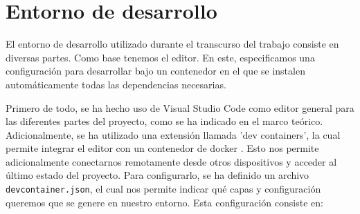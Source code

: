 \section{Entorno de desarrollo}

El entorno de desarrollo utilizado durante el transcurso del trabajo consiste en diversas partes. Como base tenemos el editor. En este, especificamos una configuración para desarrollar bajo un contenedor en el que se instalen automáticamente todas las dependencias necesarias.

Primero de todo, se ha hecho uso de Visual Studio Code como editor general para las diferentes partes del proyecto, como se ha indicado en el marco teórico. Adicionalmente, se ha utilizado una extensión llamada 'dev containers', la cual permite integrar el editor con un contenedor de docker \cite{devcontainers}. Esto nos permite adicionalmente conectarnos remotamente desde otros dispositivos y acceder al último estado del proyecto. Para configurarlo, se ha definido un archivo \texttt{devcontainer.json}, el cual nos permite indicar qué capas y configuración queremos que se genere en nuestro entorno. Esta configuración consiste en:

